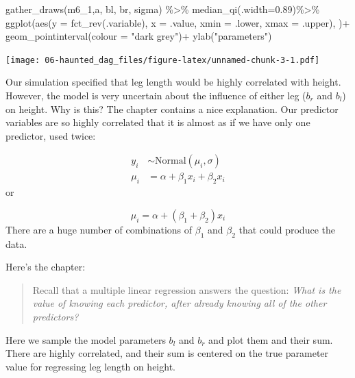 \documentclass[
]{book}
\newenvironment{Shaded}{\begin{snugshade}}{\end{snugshade}}
\newcommand{\AttributeTok}[1]{\textcolor[rgb]{0.77,0.63,0.00}{#1}}
\newcommand{\FloatTok}[1]{\textcolor[rgb]{0.00,0.00,0.81}{#1}}
\newcommand{\FunctionTok}[1]{\textcolor[rgb]{0.00,0.00,0.00}{#1}}
\newcommand{\NormalTok}[1]{#1}
\newcommand{\SpecialCharTok}[1]{\textcolor[rgb]{0.00,0.00,0.00}{#1}}
\newcommand{\StringTok}[1]{\textcolor[rgb]{0.31,0.60,0.02}{#1}}
\begin{document}
\begin{Shaded}
\begin{Highlighting}[]
\FunctionTok{gather\_draws}\NormalTok{(m6\_1,a, bl, br, sigma) }\SpecialCharTok{\%\textgreater{}\%}
  \FunctionTok{median\_qi}\NormalTok{(}\AttributeTok{.width=}\FloatTok{0.89}\NormalTok{)}\SpecialCharTok{\%\textgreater{}\%}
\FunctionTok{ggplot}\NormalTok{(}\FunctionTok{aes}\NormalTok{(}\AttributeTok{y =} \FunctionTok{fct\_rev}\NormalTok{(.variable), }\AttributeTok{x =}\NormalTok{ .value, }\AttributeTok{xmin =}\NormalTok{ .lower, }\AttributeTok{xmax =}\NormalTok{ .upper), )}\SpecialCharTok{+}
  \FunctionTok{geom\_pointinterval}\NormalTok{(}\AttributeTok{colour =} \StringTok{"dark grey"}\NormalTok{)}\SpecialCharTok{+}
  \FunctionTok{ylab}\NormalTok{(}\StringTok{"parameters"}\NormalTok{)}
\end{Highlighting}
\end{Shaded}

\texttt{[image: 06-haunted\_dag\_files/figure-latex/unnamed-chunk-3-1.pdf]}

Our simulation specified that leg length would be highly correlated with height. However, the model is very uncertain about the influence of either leg (\(b_r\) and \(b_l\)) on height. Why is this? The chapter contains a nice explanation. Our predictor variables are so highly correlated that it is almost as if we have only one predictor, used twice:

\[
\begin{aligned}
y_i &∼ \text{Normal}(\mu_i, \sigma) \\
\mu_i &= \alpha + \beta_1 x_i + \beta_2 x_i
\end{aligned}
\]
or

\[
\mu_i = \alpha + (\beta_1  + \beta_2 )x_i
\]
There are a huge number of combinations of \(\beta_1\) and \(\beta_2\) that could produce the data.

Here's the chapter:

\begin{quote}
Recall that a multiple linear regression answers the question: \emph{What is the value of knowing each predictor, after already knowing all of the other predictors?}
\end{quote}

Here we sample the model parameters \(b_l\) and \(b_r\) and plot them and their sum. There are highly correlated, and their sum is centered on the true parameter value for regressing leg length on height.
\end{document}
